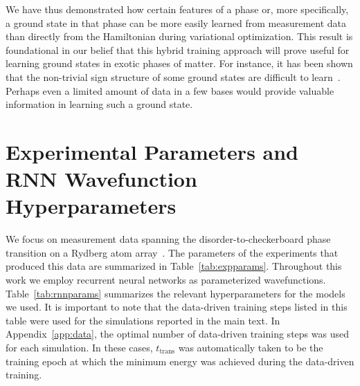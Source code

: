 \documentclass[twocolumn,
                showpacs,
                nofootinbib,
                nobibnotes,
                aps,
                superscriptaddress,
                amssymb,
                amsmath,
                floatfix,
                reprint,
                prx, 
                notitlepage,
                showkeys,
                10pt,
		]{revtex4-2}
\begin{document}
We have thus demonstrated how certain features of a phase or, more specifically, a ground state in that phase can be more easily learned from measurement data than directly from the Hamiltonian during variational optimization. This result is foundational in our belief that this hybrid training approach will prove useful for learning ground states in exotic phases of matter. For instance, it has been shown that the non-trivial sign structure of some ground states are difficult to learn~\cite{westerhout2019neural,bukov2021learning}. Perhaps even a limited amount of data in a few bases would provide valuable information in learning such a ground state.




\section{Experimental Parameters and RNN Wavefunction Hyperparameters}\label{app:params}

We focus on measurement data spanning the disorder-to-checkerboard phase transition on a Rydberg atom array~\cite{ebadi2021quantum}. The parameters of the experiments that produced this data are summarized in Table~\ref{tab:expparams}. 
Throughout this work we employ recurrent neural networks as parameterized wavefunctions. Table~\ref{tab:rnnparams} summarizes the relevant hyperparameters for the models we used. It is important to note that the data-driven training steps listed in this table were used for the simulations reported in the main text. In Appendix~\ref{app:data}, the optimal number of data-driven training steps was used for each simulation. In these cases, $t_{\text{trans}}$ was automatically taken to be the training epoch at which the minimum energy was achieved during the data-driven training.

\vspace*{1.5mm}
\end{document}
